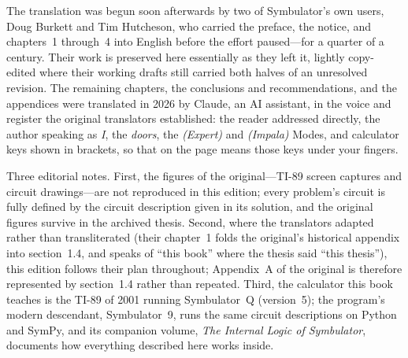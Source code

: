 \documentclass[11pt,oneside]{report}
\newcommand{\key}[1]{%
  \setlength{\fboxsep}{1.6pt}%
  \fbox{\footnotesize\textsf{#1}}}
\begin{document}
The translation was begun soon afterwards by two of Symbulator's own
users, Doug Burkett and Tim Hutcheson, who carried the preface, the
notice, and chapters~1 through~4 into English before the effort
paused---for a quarter of a century. Their work is preserved here
essentially as they left it, lightly copy-edited where their working
drafts still carried both halves of an unresolved revision. The
remaining chapters, the conclusions and recommendations, and the
appendices were translated in 2026 by Claude, an AI assistant, in
the voice and register the original translators established: the
reader addressed directly, the author speaking as \emph{I}, the
\emph{doors}, the \emph{(Expert)} and \emph{(Impala)} Modes, and
calculator keys shown in brackets, so that \key{2nd} \key{ENTER} on
the page means those keys under your fingers.

Three editorial notes. First, the figures of the original---TI-89
screen captures and circuit drawings---are not reproduced in this
edition; every problem's circuit is fully defined by the circuit
description given in its solution, and the original figures survive
in the archived thesis. Second, where the translators adapted rather
than transliterated (their chapter~1 folds the original's historical
appendix into section~1.4, and speaks of ``this book'' where the
thesis said ``this thesis''), this edition follows their plan
throughout; Appendix~A of the original is therefore represented by
section~1.4 rather than repeated. Third, the calculator this book
teaches is the TI-89 of 2001 running Symbulator~Q (version~5); the
program's modern descendant, Symbulator~9, runs the same circuit
descriptions on Python and SymPy, and its companion volume,
\emph{The Internal Logic of Symbulator}, documents how everything
described here works inside.

\tableofcontents















\end{document}
